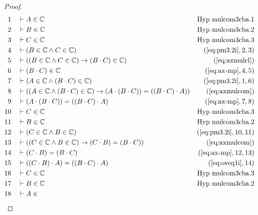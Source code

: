 \begin{proof}
\begin{align}
  1 &&  & \vdash A \in \mathbb{C}&\text{Hyp~mulcom3cba.1}\notag%
  \\ 2 &&  & \vdash B \in
\mathbb{C}&\text{Hyp~mulcom3cba.2}\notag%
  \\ 3 &&  & \vdash C \in
\mathbb{C}&\text{Hyp~mulcom3cba.3}\notag%
  \\ 4 &&  & \vdash ( B \in \mathbb{C} \wedge C \in \mathbb{C}
     )&(\mbox{\ref{eq:pm3.2i}},2,3)\notag
  \\ 5 &&  & \vdash ( ( B \in \mathbb{C} \wedge C \in \mathbb{C} ) \rightarrow
     ( B \cdot C ) \in \mathbb{C}
     )&(\mbox{\ref{eq:axmulcl}})\notag
  \\ 6 &&  & \vdash ( B \cdot C ) \in
     \mathbb{C}&(\mbox{\ref{eq:ax-mp}},4,5)\notag
  \\ 7 &&  & \vdash ( A \in \mathbb{C} \wedge ( B \cdot C ) \in \mathbb{C}
     )&(\mbox{\ref{eq:pm3.2i}},1,6)\notag
  \\ 8 &&  & \vdash ( ( A \in \mathbb{C} \wedge ( B \cdot C ) \in \mathbb{C} )
     \rightarrow ( A \cdot ( B \cdot C ) ) = ( ( B \cdot C
     ) \cdot A ) )&(\mbox{\ref{eq:axmulcom}})\notag
  \\ 9 &&  & \vdash ( A \cdot ( B \cdot C ) ) = ( ( B \cdot C ) \cdot A
     )&(\mbox{\ref{eq:ax-mp}},7,8)\notag
  \\ 10 &&  & \vdash C \in
\mathbb{C}&\text{Hyp~mulcom3cba.3}\notag%
  \\ 11 &&  & \vdash B \in
\mathbb{C}&\text{Hyp~mulcom3cba.2}\notag%
  \\ 12 &&  & \vdash ( C \in \mathbb{C} \wedge B \in \mathbb{C}
     )&(\mbox{\ref{eq:pm3.2i}},10,11)\notag
  \\ 13 &&  & \vdash ( ( C \in \mathbb{C} \wedge B \in \mathbb{C} ) \rightarrow
     ( C \cdot B ) = ( B \cdot C )
     )&(\mbox{\ref{eq:axmulcom}})\notag
  \\ 14 &&  & \vdash ( C \cdot B ) = ( B \cdot C
     )&(\mbox{\ref{eq:ax-mp}},12,13)\notag
  \\ 15 &&  & \vdash ( ( C \cdot B ) \cdot A ) = ( ( B \cdot C ) \cdot A
     )&(\mbox{\ref{eq:oveq1i}},14)\notag
  \\ 16 &&  & \vdash C \in
\mathbb{C}&\text{Hyp~mulcom3cba.3}\notag%
  \\ 17 &&  & \vdash B \in
\mathbb{C}&\text{Hyp~mulcom3cba.2}\notag%
  \\ 18 &&  & \vdash A \in

\end{align}
\end{proof}
